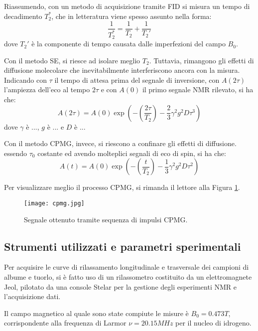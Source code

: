 Riassumendo, con un metodo di acquisizione tramite FID si misura un tempo di decadimento $T_2^*$, che in letteratura viene spesso assunto nella forma:
\begin{equation}
	\frac{1}{T_2^*} = \frac{1}{T_2} +\frac{1}{T_2'}
\end{equation}
dove $T_2'$ è la componente di tempo causata dalle imperfezioni del campo $B_0$.

Con il metodo SE, si riesce ad isolare meglio $T_2$. Tuttavia, rimangono gli effetti di diffusione molecolare che inevitabilmente interferiscono ancora con la misura. Indicando con $\tau$ il tempo di attesa prima del segnale di inversione, con $A(2\tau)$ l'ampiezza dell'eco al tempo $2\tau$ e con $A(0)$ il primo segnale NMR rilevato, si ha che:
\begin{equation}
	A(2\tau) = A(0)\exp\left(-\left(\frac{2\tau}{T_2}\right) - \frac{2}{3} \gamma^2 g^2 D \tau^3\right)
\end{equation}
dove $\gamma$ è ..., $g$ è ... e $D$ è ...

Con il metodo CPMG, invece, si riescono a confinare gli effetti di diffusione. essendo $\tau_0$ costante ed avendo molteplici segnali di eco di spin, si ha che:
\begin{equation}
	A(t) = A(0)\exp\left(-\left(\frac{t}{T_2}\right) - \frac{1}{3} \gamma^2 g^2 D \tau^2\right)
\end{equation}

Per visualizzare meglio il processo CPMG, si rimanda il lettore alla Figura \ref{fig:cpmg}.

\begin{figure}
\centering
\texttt{[image: cpmg.jpg]}
\caption{Segnale ottenuto tramite sequenza di impulsi CPMG.}
\label{fig:cpmg}
\end{figure}

\subsection*{Strumenti utilizzati e parametri sperimentali}

Per acquisire le curve di rilassamento longitudinale e trasversale dei campioni di albume e tuorlo, si è fatto uso di un rilassometro costituito da un elettromagnete Jeol, pilotato da una console Stelar per la gestione degli esperimenti NMR e l'acquisizione dati.

Il campo magnetico al quale sono state compiute le misure è $B_0 = 0.473\si{T}$, corrispondente alla frequenza di Larmor $\nu = 20.15\si{MHz}$ per il nucleo di idrogeno.

